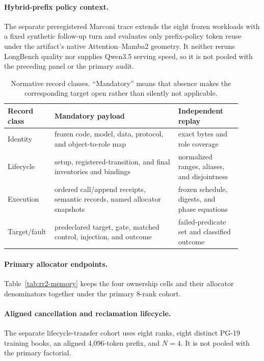 \documentclass{article}
\begin{document}
\paragraph{Hybrid-prefix policy context.}
The separate preregistered Marconi trace extends the eight frozen workloads
with a fixed synthetic follow-up turn and evaluates only prefix-policy token
reuse under the artifact's native Attention--Mamba2 geometry.  It neither
reruns LongBench quality nor supplies Qwen3.5 serving speed, so it is not
pooled with the preceding panel or the primary audit.


\begin{table}[H]
  \caption{Normative record classes.  ``Mandatory'' means that absence makes
  the corresponding target open rather than silently not applicable.}
  \label{tab:normative-records}
  \centering\footnotesize
  \begin{tabular}{@{}p{0.14\linewidth}p{0.51\linewidth}p{0.26\linewidth}@{}}
    \toprule
    Record class & Mandatory payload & Independent replay \tabularnewline
    \midrule
    Identity & frozen code, model, data, protocol, and object-to-role map & exact bytes and role coverage \\
    Lifecycle & setup, registered-transition, and final inventories and bindings & normalized ranges, aliases, and disjointness \\
    Execution & ordered call/append receipts, semantic records, named allocator snapshots & frozen schedule, digests, and phase equations \\
    Target/fault & predeclared target, gate, matched control, injection, and outcome & failed-predicate set and classified outcome \\
    \bottomrule
  \end{tabular}
\end{table}

\paragraph{Primary allocator endpoints.}
Table~\ref{tab:rr2-memory} keeps the four ownership cells and their allocator
denominators together under the primary 8-rank cohort.


\paragraph{Aligned cancellation and reclamation lifecycle.}
The separate lifecycle-transfer cohort uses eight ranks, eight distinct PG-19
training books, an aligned 4,096-token prefix, and $N=4$.  It is not pooled
with the primary factorial.
\end{document}
